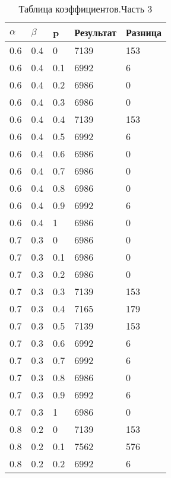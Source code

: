 \begin{table}[ht]
	\centering
	\caption{Таблица коэффициентов.Часть 3}
	\label{table:ref3}
	\begin{tabular}{ | l | l | l | l | l |}
		\hline
		$\alpha$ & $\beta$ & p   & Результат & Разница \\
		\hline
		0.6      & 0.4     & 0   & 7139      & 153     \\
		0.6      & 0.4     & 0.1 & 6992      & 6       \\
		0.6      & 0.4     & 0.2 & 6986      & 0       \\
		0.6      & 0.4     & 0.3 & 6986      & 0       \\
		0.6      & 0.4     & 0.4 & 7139      & 153     \\
		0.6      & 0.4     & 0.5 & 6992      & 6       \\
		0.6      & 0.4     & 0.6 & 6986      & 0       \\
		0.6      & 0.4     & 0.7 & 6986      & 0       \\
		0.6      & 0.4     & 0.8 & 6986      & 0       \\
		0.6      & 0.4     & 0.9 & 6992      & 6       \\
		0.6      & 0.4     & 1   & 6986      & 0       \\
		0.7      & 0.3     & 0   & 6986      & 0       \\
		0.7      & 0.3     & 0.1 & 6986      & 0       \\
		0.7      & 0.3     & 0.2 & 6986      & 0       \\
		0.7      & 0.3     & 0.3 & 7139      & 153     \\
		0.7      & 0.3     & 0.4 & 7165      & 179     \\
		0.7      & 0.3     & 0.5 & 7139      & 153     \\
		0.7      & 0.3     & 0.6 & 6992      & 6       \\
		0.7      & 0.3     & 0.7 & 6992      & 6       \\
		0.7      & 0.3     & 0.8 & 6986      & 0       \\
		0.7      & 0.3     & 0.9 & 6992      & 6       \\
		0.7      & 0.3     & 1   & 6986      & 0       \\
		0.8      & 0.2     & 0   & 7139      & 153     \\
		0.8      & 0.2     & 0.1 & 7562      & 576     \\
		0.8      & 0.2     & 0.2 & 6992      & 6       \\

\end{tabular}
\end{table}
